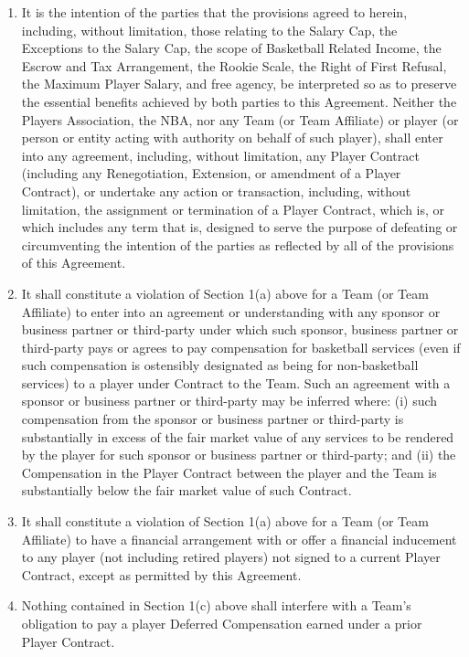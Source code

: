 \documentclass[
]{book}
\providecommand{\tightlist}{%
  \setlength{\itemsep}{0pt}\setlength{\parskip}{0pt}}
\begin{document}
\begin{enumerate}
\def\labelenumi{(\alph{enumi})}
\tightlist
\item
  It is the intention of the parties that the provisions agreed to
  herein, including, without limitation, those relating to the Salary Cap, the Exceptions to the Salary Cap, the scope of Basketball Related Income, the Escrow and Tax Arrangement, the Rookie Scale, the Right of First Refusal, the Maximum Player Salary, and free agency, be interpreted so as to preserve the essential benefits achieved by both parties to this Agreement. Neither the Players Association, the NBA, nor any Team (or Team Affiliate) or player (or person or entity acting with authority on behalf of such player), shall enter into any agreement, including, without limitation, any Player Contract (including any Renegotiation, Extension, or amendment of a Player Contract), or undertake any action or transaction, including, without limitation, the assignment or termination of a Player Contract, which is, or which includes any term that is, designed to serve the purpose of defeating or circumventing the intention of the parties as reflected by all of the provisions of this Agreement.
\item
  It shall constitute a violation of Section 1(a) above for a Team (or Team Affiliate) to enter into an agreement or understanding with any sponsor or business partner or third-party under which such sponsor, business partner or third-party pays or agrees to pay compensation for basketball services (even if such compensation is ostensibly designated as being for non-basketball services) to a player under Contract to the Team. Such an agreement with a sponsor or business partner or third-party may be inferred where: (i) such compensation from the sponsor or business partner or third-party is substantially in excess of the fair market value of any services to be rendered by the player for such sponsor or business partner or third-party; and (ii) the Compensation in the Player Contract between the player and the Team is substantially below the fair market value of such Contract.
\item
  It shall constitute a violation of Section 1(a) above for a Team (or Team Affiliate) to have a financial arrangement with or offer a financial inducement to any player (not including retired players) not signed to a current Player Contract, except as permitted by this Agreement.
\item
  Nothing contained in Section 1(c) above shall interfere with a Team's obligation to pay a player Deferred Compensation earned under a prior Player Contract.
\end{enumerate}
\end{document}
